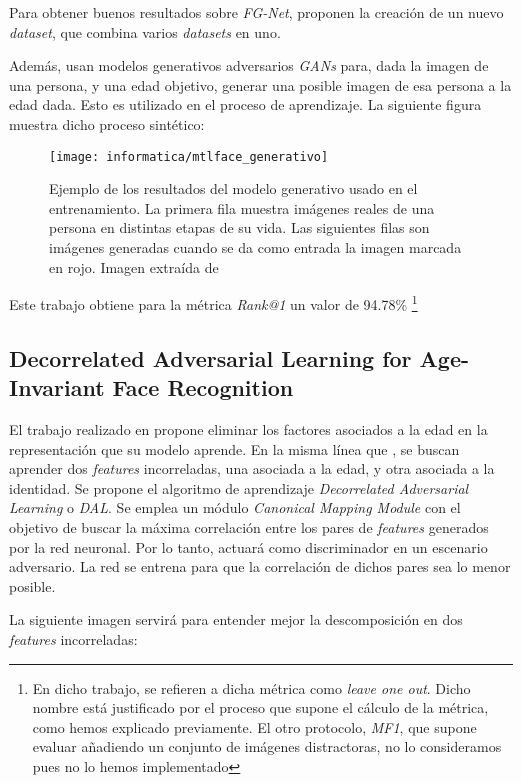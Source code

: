 Para obtener buenos resultados sobre \textit{FG-Net}, proponen la creación de un nuevo \textit{dataset}, que combina varios \textit{datasets} en uno.

Además, usan modelos generativos adversarios \textit{GANs} para, dada la imagen de una persona, y una edad objetivo, generar una posible imagen de esa persona a la edad dada. Esto es utilizado en el proceso de aprendizaje. La siguiente figura muestra dicho proceso sintético:

\begin{figure}[H]
    \centering
    \texttt{[image: informatica/mtlface\_generativo]}
    \caption{Ejemplo de los resultados del modelo generativo usado en el entrenamiento. La primera fila muestra imágenes reales de una persona en distintas etapas de su vida. Las siguientes filas son imágenes generadas cuando se da como entrada la imagen marcada en rojo. Imagen extraída de \cite{informatica:best_fgnet_model}}
\end{figure}

Este trabajo obtiene para la métrica \textit{Rank@1} un valor de 94.78\% \footnote{En dicho trabajo, se refieren a dicha métrica como \textit{leave one out}. Dicho nombre está justificado por el proceso que supone el cálculo de la métrica, como hemos explicado previamente. El otro protocolo, \textit{MF1}, que supone evaluar añadiendo un conjunto de imágenes distractoras, no lo consideramos pues no lo hemos implementado }

\subsection{Decorrelated Adversarial Learning for Age-Invariant Face Recognition}

El trabajo realizado en \cite{informatica:dal} propone eliminar los factores asociados a la edad en la representación que su modelo aprende. En la misma línea que , se buscan aprender dos \textit{features} incorreladas, una asociada a la edad, y otra asociada a la identidad. Se propone el algoritmo de aprendizaje \textit{Decorrelated Adversarial Learning} o \textit{DAL}. Se emplea un módulo \textit{Canonical Mapping Module} con el objetivo de buscar la máxima correlación entre los pares de \textit{features} generados por la red neuronal. Por lo tanto, actuará como discriminador en un escenario adversario. La red se entrena para que la correlación de dichos pares sea lo menor posible.

La siguiente imagen servirá para entender mejor la descomposición en dos \textit{features} incorreladas:

